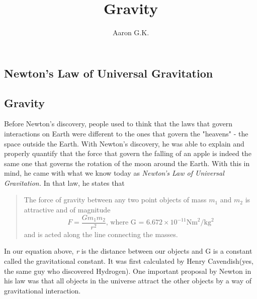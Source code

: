 \documentclass[9pt]{article}
\title{Gravity}
\author{Aaron G.K.}
\begin{document}
	\maketitle
	\begin{center}
	\section*{Newton's Law of Universal Gravitation}	
	\end{center}
	\subsection*{Gravity}
	Before Newton's discovery, people used to think that the laws that govern interactions on Earth were different to the ones that govern the "heavens" - the space outside the Earth. With Newton's discovery, he was able to explain and properly quantify that the force that govern the falling of an apple is indeed the same one that governs the rotation of the moon around the Earth. With this in mind, he came with what we know today as \textit{Newton's Law of Universal Gravitation.} In that law, he states that
	\begin{quote}
		The force of gravity between any two point objects of mass $m_1$ and $m_2$ is attractive and of magnitude
		$$F=\dfrac{Gm_1m_2}{r^2}\text{,           where G = }6.672\times10^{-11}\text{Nm}^2/\text{kg}^2	$$
		and is acted along the line connecting the masses.
	\end{quote}
	In our equation above, \textit{r} is the distance between our objects and G is a constant called the gravitational constant. It was first calculated by Henry Cavendish(yes, the same guy who discovered Hydrogen). One important proposal by Newton in his law was that all objects in the universe attract the other objects by a way of gravitational interaction. 
\end{document}
